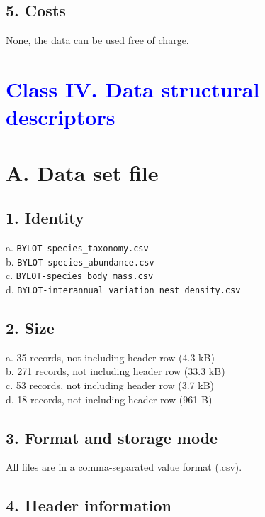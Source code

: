 \documentclass[a4paper,twoside,12pt]{article}
\begin{document}
                \subsection*{5. Costs}
                None, the data can be used free of charge.          
\newpage
    
 \section*{\textcolor{Blue}{Class IV. Data structural descriptors}}
    \section*{A. Data set file}
                        \subsection*{1. Identity} 
                        a. \texttt{BYLOT-species\_taxonomy.csv}\\
                b. \texttt{BYLOT-species\_abundance.csv}\\
                c. \texttt{BYLOT-species\_body\_mass.csv}\\
                        d. \texttt{BYLOT-interannual\_variation\_nest\_density.csv}\\ 
                        
                        \subsection*{2. Size} 
                        a. 35 records, not including header row (4.3 kB)\\
                        b. 271 records, not including header row  (33.3 kB)\\
                        c. 53 records, not including header row  (3.7 kB)\\
                        d. 18 records, not including header row  (961 B)
                        
                        \subsection*{3. Format and storage mode} All files are in a comma-separated value format (.csv). 
      
                        \subsection*{4. Header information} 
\end{document}
